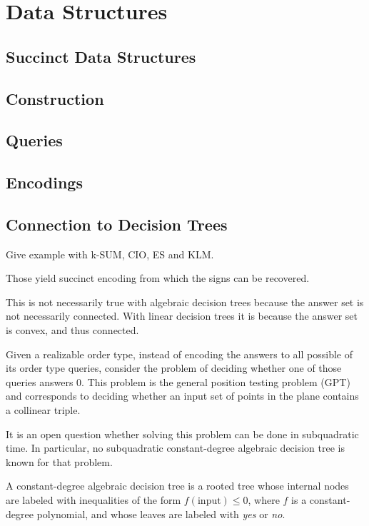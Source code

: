 \chapter{Data Structures}

\section{Succinct Data Structures}

\section{Construction}

\section{Queries}

\section{Encodings}

\section{Connection to Decision Trees}

Give example with k-SUM, CIO, ES and KLM.

Those yield succinct encoding from which the signs can be recovered.

This is not necessarily true with algebraic decision trees because the answer
set is not necessarily connected. With linear decision trees it is because the
answer set is convex, and thus connected.

Given a realizable order type, instead of encoding the answers to all possible
of its order type queries, consider the problem of deciding whether one of
those queries answers \(0\).
This problem is the general position testing problem (GPT) and corresponds to
deciding whether an input set of points in the plane contains a collinear
triple.

It is an open question whether solving this problem can be done in subquadratic
time. In particular, no subquadratic constant-degree algebraic decision tree is
known for that problem.

A constant-degree algebraic decision tree is a rooted tree whose internal nodes are
labeled with inequalities of the form \(f(\text{input}) \leq 0\), where
\(f\) is a constant-degree polynomial,
and whose leaves are labeled with \emph{yes} or \emph{no}.

